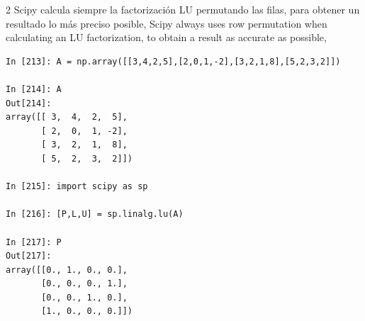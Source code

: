\begin{paracol}{2}
 Scipy calcula siempre la factorización LU permutando las filas, para obtener un resultado lo más preciso posible,
 \switchcolumn
 Scipy always uses row permutation when calculating an LU factorization, to obtain a result as accurate as possible,   
\end{paracol}

\begin{center}	
\begin{minipage}{0.7\textwidth}
\begin{verbatim}
In [213]: A = np.array([[3,4,2,5],[2,0,1,-2],[3,2,1,8],[5,2,3,2]])

In [214]: A
Out[214]: 
array([[ 3,  4,  2,  5],
       [ 2,  0,  1, -2],
       [ 3,  2,  1,  8],
       [ 5,  2,  3,  2]])

In [215]: import scipy as sp

In [216]: [P,L,U] = sp.linalg.lu(A)

In [217]: P
Out[217]: 
array([[0., 1., 0., 0.],
       [0., 0., 0., 1.],
       [0., 0., 1., 0.],
       [1., 0., 0., 0.]])
\end{verbatim}
\end{minipage}
\end{center}

